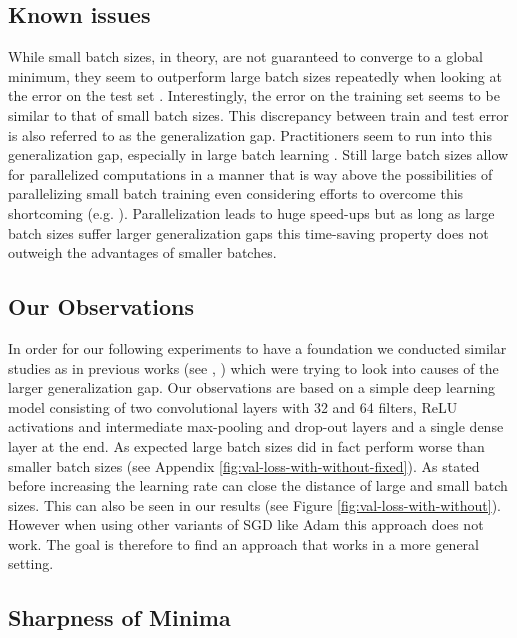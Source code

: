 \documentclass[10pt,conference,compsocconf]{IEEEtran}
\begin{document}
\subsection{Known issues}
\label{subsec:known-issues}

While small batch sizes, in theory, are not guaranteed to converge to a global minimum, they seem to outperform large batch sizes repeatedly when looking at the error on the test set \cite{keskar2017largebatch}. Interestingly, the error on the training set seems to be similar to that of small batch sizes. This discrepancy between train and test error is also referred to as the generalization gap. Practitioners seem to run into this generalization gap, especially in large batch learning \cite{lecunEfficientBackProp2012}. Still large batch sizes allow for parallelized computations in a manner that is way above the possibilities of parallelizing small batch training even considering efforts to overcome this shortcoming (e.g. \cite{dasDistributedDeepLearning2016}). Parallelization leads to huge speed-ups but as long as large batch sizes suffer larger generalization gaps this time-saving property does not outweigh the advantages of smaller batches.

\subsection{Our Observations}
\label{subsec:our-observations}

In order for our following experiments to have a foundation we conducted similar studies as in previous works (see \cite{changEffectBatchSize2020}, \cite{shenEffectBatchSize2018}) which were trying to look into causes of the larger generalization gap. Our observations are based on a simple deep learning model consisting of two convolutional layers with 32 and 64 filters, ReLU activations and intermediate max-pooling and drop-out layers and a single dense layer at the end. As expected large batch sizes did in fact perform worse than smaller batch sizes (see Appendix \ref{fig:val-loss-with-without-fixed}). As stated before increasing the learning rate can close the distance of large and small batch sizes. This can also be seen in our results (see Figure \ref{fig:val-loss-with-without}). However when using other variants of SGD like Adam this approach does not work. The goal is therefore to find an approach that works in a more general setting.

\subsection{Sharpness of Minima}
\label{subsec:sharpness}
\end{document}
